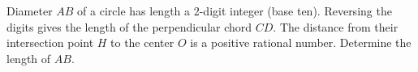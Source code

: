 Diameter $AB$ of a circle has length a 2-digit integer (base ten).  Reversing the digits gives the length of the perpendicular chord $CD$.  The distance from their intersection point $H$ to the center $O$ is a positive rational number.  Determine the length of $AB$.
